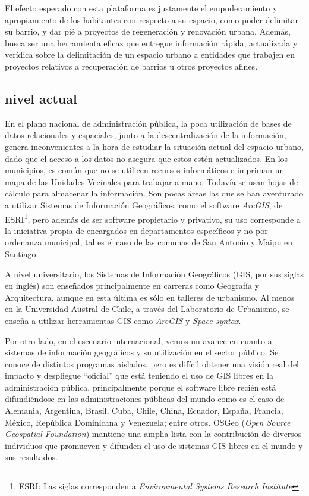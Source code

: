 \documentclass[12pt]{article}
\begin{document}
El efecto esperado con esta plataforma es justamente el
empoderamiento y apropiamiento de los habitantes con respecto a su espacio, como
poder delimitar su barrio, y dar
pié a proyectos de regeneración y renovación urbana.
Además, busca ser una herramienta eficaz que entregue información rápida,
actualizada y verídica sobre la delimitación de un espacio urbano a entidades
que trabajen en proyectos relativos a recuperación de barrios u otros proyectos
afines.

\subsection{nivel actual}
En el plano nacional de administración pública, la poca utilización de bases de datos
relacionales y espaciales, junto a la descentralización de la información, genera inconvenientes a la
hora de estudiar la situación actual del espacio urbano, dado que el acceso a
los datos no asegura que estos estén actualizados. En los municipios, es común que no se
utilicen recursos informáticos e impriman un mapa de las Unidades Vecinales para trabajar a
mano. Todavía se usan hojas de cálculo para almacenar la
información. Son pocas áreas las que se han aventurado a utilizar Sistemas de
Información Geográficos, como el software \emph{ArcGIS}, de ESRI\footnote{ESRI:
Las siglas corresponden a \emph{Environmental Systems Research Institute}}, pero
además de ser software propietario y privativo, su uso corresponde a la
iniciativa propia de encargados en departamentos específicos y no por ordenanza
municipal, tal es el caso de las comunas de San Antonio y Maipu en Santiago.

A nivel universitario, los Sistemas de Información Geográficos (GIS, por sus
siglas en inglés) son enseñados principalmente en
carreras como Geografía y Arquitectura, aunque en esta última es sólo en
talleres de urbanismo. Al menos en la Universidad Austral
de Chile, a través del Laboratorio de Urbanismo, se enseña a utilizar
herramientas GIS como \emph{ArcGIS} y \emph{Space syntax}.

Por otro lado, en el escenario internacional, vemos un avance en cuanto a
sistemas de información geográficos y su utilización en el sector público. Se
conoce de distintos programas aislados, pero es difícil obtener una visión real
del impacto y despliegue ``oficial'' que está teniendo el uso de GIS libres en la
administración pública, principalmente porque el software libre recién está
difundiéndose en las administraciones públicas del mundo como es el caso de
Alemania, Argentina, Brasil, Cuba, Chile, China, Ecuador, España, Francia,
 México, República Dominicana y Venezuela; entre otros.
 OSGeo (\textit{Open
 Source Geospatial Foundation}) mantiene una amplia
lista con la contribución de
diversos individuos que promueven y difunden el uso de sistemas GIS libres en el
mundo y sus resultados. \cite{web01}
\end{document}
